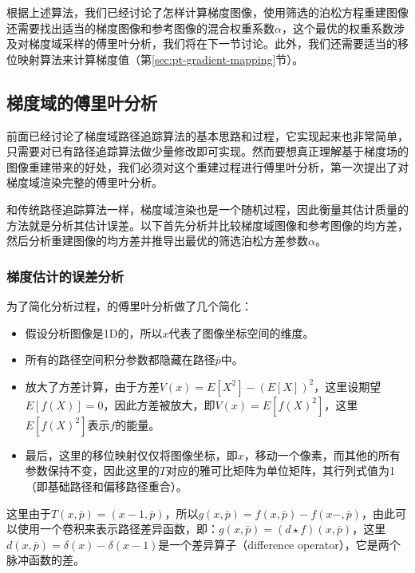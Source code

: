 根据上述算法，我们已经讨论了怎样计算梯度图像，使用筛选的泊松方程重建图像还需要找出适当的梯度图像和参考图像的混合权重系数$\alpha$，这个最优的权重系数涉及对梯度域采样的傅里叶分析，我们将在下一节讨论。此外，我们还需要适当的移位映射算法来计算梯度值（第\ref{sec:pt-gradient-mapping}节）。






\subsection{梯度域的傅里叶分析}\label{sec:pt-gradient-analysis}
前面已经讨论了梯度域路径追踪算法的基本思路和过程，它实现起来也非常简单，只需要对已有路径追踪算法做少量修改即可实现。然而要想真正理解基于梯度场的图像重建带来的好处，我们必须对这个重建过程进行傅里叶分析，\cite{a:GradientDomainPathTracing}第一次提出了对梯度域渲染完整的傅里叶分析。

和传统路径追踪算法一样，梯度域渲染也是一个随机过程，因此衡量其估计质量的方法就是分析其估计误差。以下首先分析并比较梯度域图像和参考图像的均方差，然后分析重建图像的均方差并推导出最优的筛选泊松方差参数$\alpha$。





\subsubsection{梯度估计的误差分析}
为了简化分析过程，\cite{a:GradientDomainPathTracing}的傅里叶分析做了几个简化：

\begin{itemize}
	\item 假设分析图像是1D的，所以$x$代表了图像坐标空间的维度。
	\item 所有的路径空间积分参数都隐藏在路径$\bar{p}$中。
	\item 放大了方差计算，由于方差$V(x)=E[X^2]-(E[X])^2$，这里设期望$E[f(X)]=0$，因此方差被放大，即$V(x)=E[f(X)^2]$，这里$E[f(X)^2]$表示$f$的能量。
	\item 最后，这里的移位映射仅仅将图像坐标，即$x$，移动一个像素，而其他的所有参数保持不变，因此这里的$T$对应的雅可比矩阵为单位矩阵，其行列式值为1（即基础路径和偏移路径重合）。
\end{itemize}

这里由于$T(x,\bar{p})=(x-1,\bar{p})$，所以$g(x,\bar{p})=f(x,\bar{p})-f(x-,\bar{p})$，由此可以使用一个卷积来表示路径差异函数，即：$g(x,\bar{p})=(d\star f)(x,\bar{p})$，这里$d(x,\bar{p})=\delta(x)-\delta(x-1)$是一个差异算子（difference operator），它是两个脉冲函数的差。

